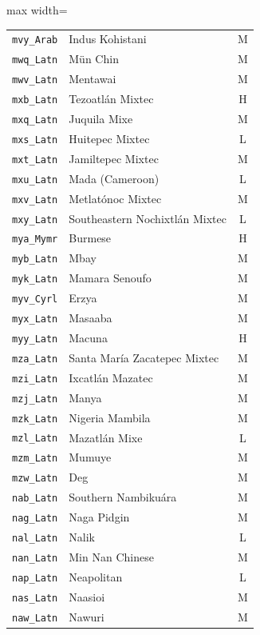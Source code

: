 {\begin{adjustbox}{max width=\textwidth}
\begin{tabular}{llc}
        \texttt{mvy\_Arab} & Indus Kohistani & M \\
        \texttt{mwq\_Latn} & Mün Chin & M \\
        \texttt{mwv\_Latn} & Mentawai & M \\
        \texttt{mxb\_Latn} & Tezoatlán Mixtec & H \\
        \texttt{mxq\_Latn} & Juquila Mixe & M \\
        \texttt{mxs\_Latn} & Huitepec Mixtec & L \\
        \texttt{mxt\_Latn} & Jamiltepec Mixtec & M \\
        \texttt{mxu\_Latn} & Mada (Cameroon) & L \\
        \texttt{mxv\_Latn} & Metlatónoc Mixtec & M \\
        \texttt{mxy\_Latn} & Southeastern Nochixtlán Mixtec & L \\
        \texttt{mya\_Mymr} & Burmese & H \\
        \texttt{myb\_Latn} & Mbay & M \\
        \texttt{myk\_Latn} & Mamara Senoufo & M \\
        \texttt{myv\_Cyrl} & Erzya & M \\
        \texttt{myx\_Latn} & Masaaba & M \\
        \texttt{myy\_Latn} & Macuna & H \\
        \texttt{mza\_Latn} & Santa María Zacatepec Mixtec & M \\
        \texttt{mzi\_Latn} & Ixcatlán Mazatec & M \\
        \texttt{mzj\_Latn} & Manya & M \\
        \texttt{mzk\_Latn} & Nigeria Mambila & M \\
        \texttt{mzl\_Latn} & Mazatlán Mixe & L \\
        \texttt{mzm\_Latn} & Mumuye & M \\
        \texttt{mzw\_Latn} & Deg & M \\
        \texttt{nab\_Latn} & Southern Nambikuára & M \\
        \texttt{nag\_Latn} & Naga Pidgin & M \\
        \texttt{nal\_Latn} & Nalik & L \\
        \texttt{nan\_Latn} & Min Nan Chinese & M \\
        \texttt{nap\_Latn} & Neapolitan & L \\
        \texttt{nas\_Latn} & Naasioi & M \\
        \texttt{naw\_Latn} & Nawuri & M \\

\end{tabular}
\end{adjustbox}}

